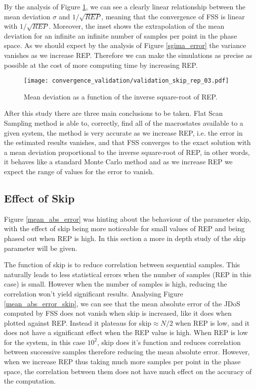 	By the analysis of Figure \ref{sigma_rep}, we can see a clearly linear relationship between the mean deviation $\sigma$ and $1/\sqrt{REP}$, meaning that the convergence of FSS is linear with $1/\sqrt{REP}$. Moreover, the inset shows the extrapolation of the mean deviation for an infinite an infinite number of samples per point in the phase space. As we should expect by the analysis of Figure \ref{sgima_error} the variance vanishes as we increase REP. Therefore we can make the simulations as precise as possible at the cost of more computing time by increasing REP.
	
\begin{figure}[h]
	\centering
	\texttt{[image: convergence\_validation/validation\_skip\_rep\_03.pdf]}
	\caption{Mean deviation as a function of the inverse square-root of REP.}
	\label{sigma_rep}
\end{figure}

	After this study there are three main conclusions to be taken. Flat Scan Sampling method is able to, correctly, find all of the macrostates available to a given system, the method is very accurate as we increase REP, i.e. the error in the estimated results vanishes, and that FSS converges to the exact solution with a mean deviation proportional to the inverse square-root of REP, in other words, it behaves like a standard Monte Carlo method and as we increase REP we expect the range of values for the error to vanish.
	
\subsection{Effect of Skip}

	Figure \ref{mean_abs_error} was hinting about the behaviour of the parameter skip, with the effect of skip being more noticeable for small values of REP and being phased out when REP is high. In this section a more in depth study of the skip parameter will be given.

	The function of skip is to reduce correlation between sequential samples. This naturally leads to less statistical errors when the number of samples (REP in this case) is small. However when the number of samples is high, reducing the correlation won't yield significant results. 
	Analysing Figure \ref{mean_abs_error_skip}, we can see that the mean absolute error of the JDoS computed by FSS does not vanish when skip is increased, like it does when plotted against REP. Instead it plateaus for skip$\approx N/2$ when REP is low, and it does not have a significant effect when the REP value is high. 
	When REP is low for the system, in this case $10^2$, skip does it's function and reduces correlation between successive samples therefore reducing the mean absolute error. However, when we increase REP thus taking much more samples per point in the phase space, the correlation between them does not have much effect on the accuracy of the computation. 
	
